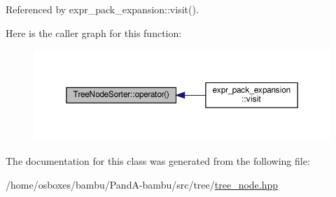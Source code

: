 Referenced by expr\+\_\+pack\+\_\+expansion\+::visit().

Here is the caller graph for this function\+:
\nopagebreak
\begin{figure}[H]
\begin{center}
\leavevmode
\includegraphics[width=350pt]{d6/d1f/classTreeNodeSorter_acf8467e107543d4a8a108e15bc8aec33_icgraph}
\end{center}
\end{figure}


The documentation for this class was generated from the following file\+:\begin{DoxyCompactItemize}
\item 
/home/osboxes/bambu/\+Pand\+A-\/bambu/src/tree/\hyperlink{tree__node_8hpp}{tree\+\_\+node.\+hpp}\end{DoxyCompactItemize}
